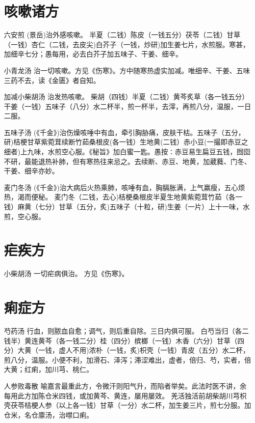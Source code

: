 \documentclass[a4paper,12pt,UTF8,twoside]{ctexbook}
\begin{document}
    \section{咳嗽诸方}	
    
    六安煎
    (景岳)治外感咳嗽。
    半夏（二钱）陈皮（一钱五分）茯苓（二钱）甘草（一钱）杏仁（二钱，去皮尖)白芥子（一钱，炒研)加生姜七片，水煎服。寒甚，加细辛七分；愚每用，必去白芥子加五味子、干姜、细辛。
    
    小青龙汤
    治一切咳嗽。方见《伤寒》。方中随寒热虚实加减。唯细辛、干姜、五味三药不去，读《金匮》者自知。
    
    加减小柴胡汤
    治发热咳嗽。
    柴胡（四钱）半夏（二钱）黄芩炙草（各一钱五分）干姜（一钱）五味子（八分）水二杯半，煎一杯半，去滓，再煎八分，温服，一日二服。
    
    五味子汤
    (《千金》)治伤燥咳唾中有血，牵引胸胁痛，皮肤干枯。五味子（五分，研)桔梗甘草紫菀茸续断竹茹桑根皮(各一钱）生地黄(二钱）赤小豆(一撮即赤豆之细者)上九味，水煎空心服。《秘旨》加白蜜一匙。愚按∶赤豆易生扁豆五钱，囫囵不研，最能退热补肺，但有寒热往来忌之。去续断、赤豆、地黄，加葳蕤、门冬、干姜、细辛亦妙。
    
    麦门冬汤
    (《千金》)治大病后火热乘肺，咳唾有血，胸膈胀满，上气羸瘦，五心烦热，渴而便秘。
    麦门冬（二钱，去心)桔梗桑根皮半夏生地黄紫菀茸竹茹（各一钱）麻黄（七分）甘草（五分，炙)五味子（十粒，研)生姜（一片）上十一味，水煎，空心服。
    
    \section{疟疾方}
    
    小柴胡汤
    一切疟病俱治。
    方见《伤寒》。
    
    \section{痢症方}	
    
    芍药汤
    行血，则脓血自愈；调气，则后重自除。三日内俱可服。
    白芍当归（各二钱半）黄连黄芩（各一钱二分）桂（四分）槟榔（一钱）木香（六分）甘草（四分）大黄（一钱，虚人不用)浓朴（一钱，炙)枳壳（一钱）青皮（五分）水二杯，煎八分，温服。小便不利，加滑石、泽泻；滞涩难出，虚者，倍归、芍，实者，倍大黄；红痢，加川芎、桃仁。
    
    人参败毒散
    喻嘉言最重此方，令微汗则阳气升，而陷者举矣。此法时医不讲，余每用此方加陈仓米四钱，或加黄芩、黄连，屡用屡效。
    羌活独活前胡柴胡川芎枳壳茯苓桔梗人参（以上各一钱）甘草（一分）水二杯，加生姜三片，煎七分服。加仓米，名仓廪汤，治噤口痢。
    
\end{document}
